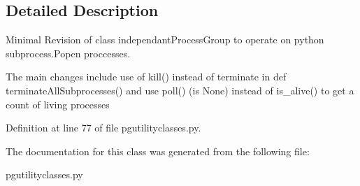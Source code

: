 \subsection{Detailed Description}
\begin{DoxyVerb}Minimal Revision of class independantProcessGroup   
to operate on python subprocess.Popen proccesses.

The main changes include use of kill() instead of 
terminate in def terminateAllSubprocesses() and
use poll() (is None) instead of is_alive() to get
a count of living processes
\end{DoxyVerb}
 

Definition at line 77 of file pgutilityclasses.\+py.



The documentation for this class was generated from the following file\+:\begin{DoxyCompactItemize}
\item 
pgutilityclasses.\+py\end{DoxyCompactItemize}
